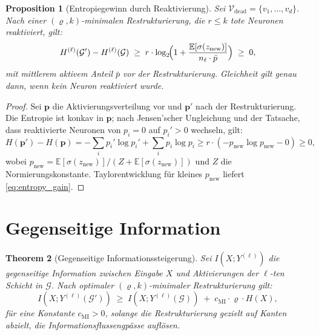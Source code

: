 \documentclass[12pt, a4paper, openany]{report}
\newtheorem{theorem}{Theorem}[chapter]
\newtheorem{proposition}[theorem]{Proposition}
\newcommand{\E}{\mathbb{E}}
\newcommand{\calG}{\mathcal{G}}
\newcommand{\calV}{\mathcal{V}}
\begin{document}
\begin{proposition}[Entropiegewinn durch Reaktivierung]
\label{prop:entropy}
Sei $\calV_{\mathrm{dead}} = \{v_1, \ldots, v_d\}$.  Nach einer
$(\varrho, k)$-minimalen Restrukturierung, die $r \leq k$ tote Neuronen
reaktiviert, gilt:
\begin{equation}
  \label{eq:entropy_gain}
  H^{(\ell)}(\calG') - H^{(\ell)}(\calG)
  \;\geq\;
  r \cdot \log_2\!\Bigl(1 + \frac{\E[\sigma(z_{\mathrm{new}})]}{n_\ell \cdot \bar{p}}\Bigr)
  \;\geq\; 0,
\end{equation}
mit mittlerem aktivem Anteil $\bar{p}$ vor der Restrukturierung.
Gleichheit gilt genau dann, wenn kein Neuron reaktiviert wurde.
\end{proposition}

\begin{proof}
Sei $\bm{p}$ die Aktivierungsverteilung vor und $\bm{p}'$ nach der
Restrukturierung.  Die Entropie ist konkav in $\bm{p}$; nach
Jensen'scher Ungleichung und der Tatsache, dass reaktivierte Neuronen
von $p_i = 0$ auf $p_i' > 0$ wechseln, gilt:
\[
  H(\bm{p}') - H(\bm{p})
  = -\sum_i p_i' \log p_i' + \sum_i p_i \log p_i
  \geq r \cdot (-p_{\mathrm{new}} \log p_{\mathrm{new}} - 0)
  \geq 0,
\]
wobei $p_{\mathrm{new}} = \E[\sigma(z_{\mathrm{new}})]/(Z + \E[\sigma(z_{\mathrm{new}})])$
und $Z$ die Normierungskonstante.  Taylorentwicklung für kleines
$p_{\mathrm{new}}$ liefert \eqref{eq:entropy_gain}.
\end{proof}

\section{Gegenseitige Information}

\begin{theorem}[Gegenseitige Informationssteigerung]
\label{thm:mutual_info}
Sei $I(X; Y^{(\ell)})$ die gegenseitige Information zwischen Eingabe $X$
und Aktivierungen der $\ell$-ten Schicht in $\calG$.
Nach optimaler $(\varrho, k)$-minimaler Restrukturierung gilt:
\begin{equation}
  \label{eq:mi_gain}
  I(X; Y^{(\ell)}(\calG')) \;\geq\; I(X; Y^{(\ell)}(\calG))
  \;+\; c_{\mathrm{MI}} \cdot \varrho \cdot H(X),
\end{equation}
für eine Konstante $c_{\mathrm{MI}} > 0$, solange die Restrukturierung
gezielt auf Kanten abzielt, die Informationsflussengpässe auflösen.
\end{theorem}
\end{document}
